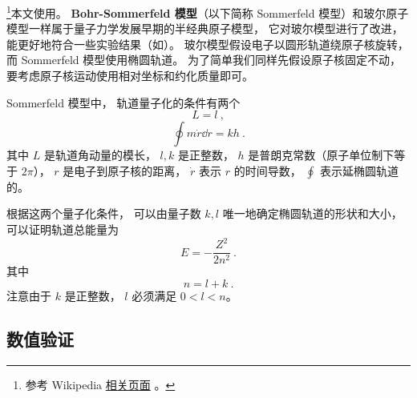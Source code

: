 

\footnote{参考 Wikipedia \href{https://en.wikipedia.org/wiki/Old_quantum_theory}{相关页面}
。}本文使用。 \textbf{Bohr-Sommerfeld 模型}（以下简称 Sommerfeld 模型）和玻尔原子模型一样属于量子力学发展早期的半经典原子模型， 它对玻尔模型进行了改进， 能更好地符合一些实验结果（如）。 玻尔模型假设电子以圆形轨道绕原子核旋转， 而 Sommerfeld 模型使用椭圆轨道。 为了简单我们同样先假设原子核固定不动， 要考虑原子核运动使用相对坐标和约化质量即可。

Sommerfeld 模型中， 轨道量子化的条件有两个
\begin{equation}\label{eq_BohrEc_4}
L = l~,
\end{equation}
\begin{equation}\label{eq_BohrEc_3}
\oint m\dot r \dd{r} = kh~.
\end{equation}
其中 $L$ 是轨道角动量的模长， $l, k$ 是正整数， $h$ 是普朗克常数（原子单位制下等于 $2\pi$）， $r$ 是电子到原子核的距离， $\dot r$ 表示 $r$ 的时间导数， $\oint$ 表示延椭圆轨道的。

根据这两个量子化条件， 可以由量子数 $k, l$ 唯一地确定椭圆轨道的形状和大小， 可以证明轨道总能量为
\begin{equation}\label{eq_BohrEc_5}
E = -\frac{Z^2}{2n^2}~.
\end{equation}
其中
\begin{equation}\label{eq_BohrEc_2}
n = l + k~.
\end{equation}
注意由于 $k$ 是正整数， $l$ 必须满足 $0 < l < n$。

\subsection{数值验证}

